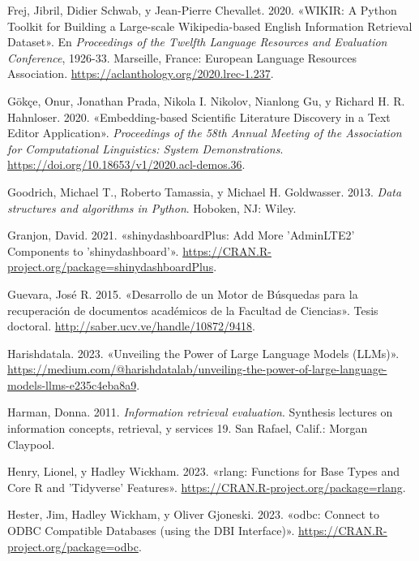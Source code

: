 \documentclass[
  12pt,
  openany]{book}
\newlength{\cslhangindent}
\newlength{\cslentryspacingunit} %
\newenvironment{CSLReferences}[2] %
 {%
  \setlength{\parindent}{0pt}
  \ifodd #1
  \let\oldpar\par
  \def\par{\hangindent=\cslhangindent\oldpar}
  \fi
  \setlength{\parskip}{#2\cslentryspacingunit}
 }%
 {}
\begin{document}
\begin{CSLReferences}{1}{0}
\leavevmode{}%
Frej, Jibril, Didier Schwab, y Jean-Pierre Chevallet. 2020. {«{WIKIR}: A Python Toolkit for Building a Large-scale {W}ikipedia-based {E}nglish Information Retrieval Dataset»}. En \emph{Proceedings of the Twelfth Language Resources and Evaluation Conference}, 1926-33. Marseille, France: European Language Resources Association. \url{https://aclanthology.org/2020.lrec-1.237}.

\leavevmode{}%
Gökçe, Onur, Jonathan Prada, Nikola I. Nikolov, Nianlong Gu, y Richard H. R. Hahnloser. 2020. {«Embedding-based Scientific Literature Discovery in a Text Editor Application»}. \emph{Proceedings of the 58th Annual Meeting of the Association for Computational Linguistics: System Demonstrations}. \url{https://doi.org/10.18653/v1/2020.acl-demos.36}.

\leavevmode{}%
Goodrich, Michael T., Roberto Tamassia, y Michael H. Goldwasser. 2013. \emph{Data structures and algorithms in Python}. Hoboken, NJ: Wiley.

\leavevmode{}%
Granjon, David. 2021. {«shinydashboardPlus: Add More 'AdminLTE2' Components to 'shinydashboard'»}. \url{https://CRAN.R-project.org/package=shinydashboardPlus}.

\leavevmode{}%
Guevara, José R. 2015. {«Desarrollo de un Motor de Búsquedas para la recuperación de documentos académicos de la Facultad de Ciencias»}. Tesis doctoral. \url{http://saber.ucv.ve/handle/10872/9418}.

\leavevmode{}%
Harishdatala. 2023. {«Unveiling the Power of Large Language Models (LLMs)»}. \url{https://medium.com/@harishdatalab/unveiling-the-power-of-large-language-models-llms-e235c4eba8a9}.

\leavevmode{}%
Harman, Donna. 2011. \emph{Information retrieval evaluation}. Synthesis lectures on information concepts, retrieval, y services 19. San Rafael, Calif.: Morgan Claypool.

\leavevmode{}%
Henry, Lionel, y Hadley Wickham. 2023. {«rlang: Functions for Base Types and Core R and 'Tidyverse' Features»}. \url{https://CRAN.R-project.org/package=rlang}.

\leavevmode{}%
Hester, Jim, Hadley Wickham, y Oliver Gjoneski. 2023. {«odbc: Connect to ODBC Compatible Databases (using the DBI Interface)»}. \url{https://CRAN.R-project.org/package=odbc}.


\end{CSLReferences}
\end{document}
